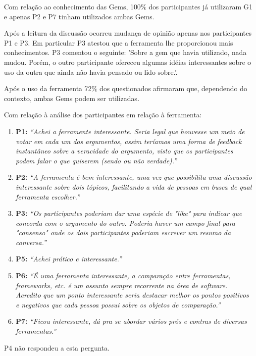 Com relação ao conhecimento das Gems, 100\% dos participantes já utilizaram G1 e apenas P2 e P7 tinham utilizados ambas Gems.

Após a leitura da discussão ocorreu mudança de opinião apenas nos participantes P1 e P3. Em particular P3 atestou que a ferramenta lhe proporcionou mais conhecimentos. P3 comentou o seguinte: 'Sobre a gem que havia utilizado, nada mudou. Porém, o outro participante ofereceu algumas idéias interessantes sobre o uso da outra que ainda não havia pensado ou lido sobre.'.

Após o uso da ferramenta 72\% dos questionados afirmaram que, dependendo do contexto, ambas Gems podem ser utilizadas.

Com relação à análise dos participantes em relação à ferramenta:
\begin{enumerate}
  \item \textbf{P1:} \textit{``Achei a ferramente interessante. Seria legal que houvesse um meio de votar em cada um dos argumentos, assim teríamos uma forma de feedback instantâneo sobre a veracidade do argumento, visto que os participantes podem falar o que quiserem (sendo ou não verdade).''}
  \item \textbf{P2:} \textit{``A ferramenta é bem interessante, uma vez que possibilita uma discussão interessante sobre dois tópicos, facilitando a vida de pessoas em busca de qual ferramenta escolher.''}
  \item \textbf{P3:} \textit{``Os participantes poderiam dar uma espécie de "like" para indicar que concorda com o argumento do outro. Poderia haver um campo final para "consenso" onde os dois participantes poderiam escrever um resumo da conversa.''}
  \item \textbf{P5:} \textit{``Achei prático e interessante.''}
  \item \textbf{P6:} \textit{``É uma ferramenta interessante, a comparação entre ferramentas, frameworks, etc. é um assunto sempre recorrente na área de software. Acredito que um ponto interessante seria destacar melhor os pontos positivos e negativos que cada pessoa possui sobre os objetos de comparação.''}
  \item \textbf{P7:} \textit{``Ficou interessante, dá pra se abordar vários prós e contras de diversas ferramentas.''}
\end{enumerate}

P4 não respondeu a esta pergunta.